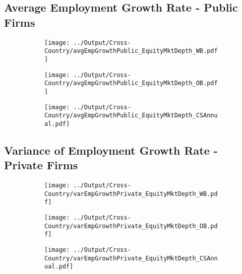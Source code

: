 \documentclass[12pt,notitlepage]{article}
\begin{document}
\subsection{Average Employment Growth Rate - Public Firms}
\begin{figure}[!htpb]
\centering
\begin{subfigure}{.49\textwidth}
    \centering
 \texttt{[image: ../Output/Cross-Country/avgEmpGrowthPublic\_EquityMktDepth\_WB.pdf]}
\end{subfigure}
\begin{subfigure}{.49\textwidth}
    \centering
  \texttt{[image: ../Output/Cross-Country/avgEmpGrowthPublic\_EquityMktDepth\_OB.pdf]}
\end{subfigure}
\begin{subfigure}{.49\textwidth}
    \centering
  \texttt{[image: ../Output/Cross-Country/avgEmpGrowthPublic\_EquityMktDepth\_CSAnnual.pdf]}
\end{subfigure}
\end{figure}
\pagebreak

\subsection{Variance of Employment Growth Rate - Private Firms}
\begin{figure}[!htpb]
\centering
\begin{subfigure}{.49\textwidth}
    \centering
 \texttt{[image: ../Output/Cross-Country/varEmpGrowthPrivate\_EquityMktDepth\_WB.pdf]}
\end{subfigure}
\begin{subfigure}{.49\textwidth}
    \centering
  \texttt{[image: ../Output/Cross-Country/varEmpGrowthPrivate\_EquityMktDepth\_OB.pdf]}
\end{subfigure}
\begin{subfigure}{.49\textwidth}
    \centering
  \texttt{[image: ../Output/Cross-Country/varEmpGrowthPrivate\_EquityMktDepth\_CSAnnual.pdf]}
\end{subfigure}
\end{figure}
\pagebreak
\end{document}
